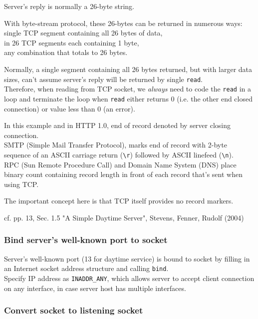 \documentclass[10pt]{amsart}
\begin{document}
Server's reply is normally a 26-byte string.

With byte-stream protocol, these 26-bytes can be returned in numerous ways: \\
single TCP segment containing all 26 bytes of data, \\
in 26 TCP segments each containing 1 byte, \\
any combination that totals to 26 bytes.

Normally, a single segment containing all 26 bytes returned, but with larger data sizes, can't assume server's reply will be returned by single \verb|read|. \\
Therefore, when reading from TCP socket, we \emph{always} need to code the \verb|read| in a loop and terminate the loop when \verb|read| either returns 0 (i.e. the other end closed connection) or value less than 0 (an error).

In this example and in HTTP 1.0, end of record denoted by server closing connection. \\
SMTP (Simple Mail Transfer Protocol), marks end of record with 2-byte sequence of an ASCII carriage return (\verb|\r|) followed by ASCII linefeed (\verb|\n|). \\
RPC (Sun Remote Procedure Call) and Domain Name System (DNS) place binary count containing record length in front of each record that's sent when using TCP.

The important concept here is that TCP itself provides no record markers.

cf. pp. 13, Sec. 1.5 "A Simple Daytime Server", Stevens, Fenner, Rudolf (2004) \cite{SFR2004}

\subsubsection{Bind server's well-known port to socket}

Server's well-known port (13 for daytime service) is bound to socket by filling in an Internet socket address structure and calling \verb|bind|. \\
Specify IP address as \verb|INADDR_ANY|, which allows server to accept client connection on any interface, in case server host has multiple interfaces.

\subsubsection{Convert socket to listening socket}
\end{document}
